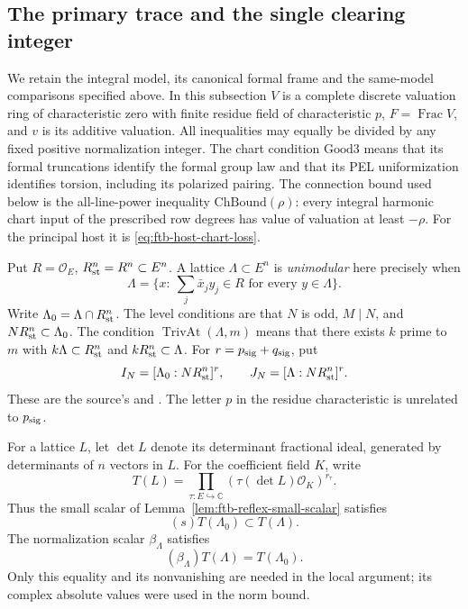 \subsection{The primary trace and the single clearing integer}
\label{subsec:ftb-primary-trace-clearing}

We retain the integral model, its canonical formal frame and the
same-model comparisons specified above.  In this subsection \(V\)
is a complete discrete valuation ring of characteristic zero with
finite residue field of characteristic \(p\), \(F=\operatorname{Frac}V\),
and \(v\) is its additive valuation.  All inequalities may equally
be divided by any fixed positive normalization integer.
The chart condition \(\mathrm{Good3}\) means that its formal
truncations identify the formal group law and that its PEL
uniformization identifies torsion, including its polarized pairing.
The connection bound used below is the all-line-power inequality
\(\mathrm{ChBound}(\rho)\): every integral harmonic chart input of
the prescribed row degrees has value of valuation at least
\(-\rho\).  For the principal host it is
\eqref{eq:ftb-host-chart-loss}.

Put \(R=\mathcal O_E\), \(R^n_{\rm st}=R^n\subset E^n\).
A lattice \(\Lambda\subset E^n\) is \emph{unimodular} here precisely
when
\[
 \Lambda=\{x:\ \sum_j\bar x_jy_j\in R\text{ for every }y\in\Lambda\}.
\]
Write \(\Lambda_0=\Lambda\cap R^n_{\rm st}\).
The level conditions are that \(N\) is odd, \(M\mid N\), and
\(NR^n_{\rm st}\subset\Lambda_0\).
The condition \(\operatorname{TrivAt}(\Lambda,m)\) means that there
exists \(k\) prime to \(m\) with
\(k\Lambda\subset R^n_{\rm st}\) and
\(kR^n_{\rm st}\subset\Lambda\).
For \(r=p_{\rm sig}+q_{\rm sig}\), put
\[
 I_N=[\Lambda_0:NR^n_{\rm st}]^r,\qquad
 J_N=[\Lambda:NR^n_{\rm st}]^r .
\]
These are the source's  and .
The letter \(p\) in the residue characteristic is unrelated to
\(p_{\rm sig}\).

For a lattice \(L\), let \(\det L\) denote its determinant fractional
ideal, generated by determinants of \(n\) vectors in \(L\).
For the coefficient field \(K\), write
\[
  T(L)=\prod_{\tau:E\hookrightarrow\mathbb C}
               (\tau(\det L)\mathcal O_K)^{r_\tau}.
\]
Thus the small scalar of Lemma~\ref{lem:ftb-reflex-small-scalar}
satisfies
\begin{equation}\label{eq:ftb-small-scalar-ideal}
                         (s)T(\Lambda_0)\subset T(\Lambda).
\end{equation}
The normalization scalar \(\beta_\Lambda\) satisfies
\[
              (\beta_\Lambda)T(\Lambda)=T(\Lambda_0).
\]
Only this equality and its nonvanishing are needed in the local
argument; its complex absolute values were used in the norm bound.

